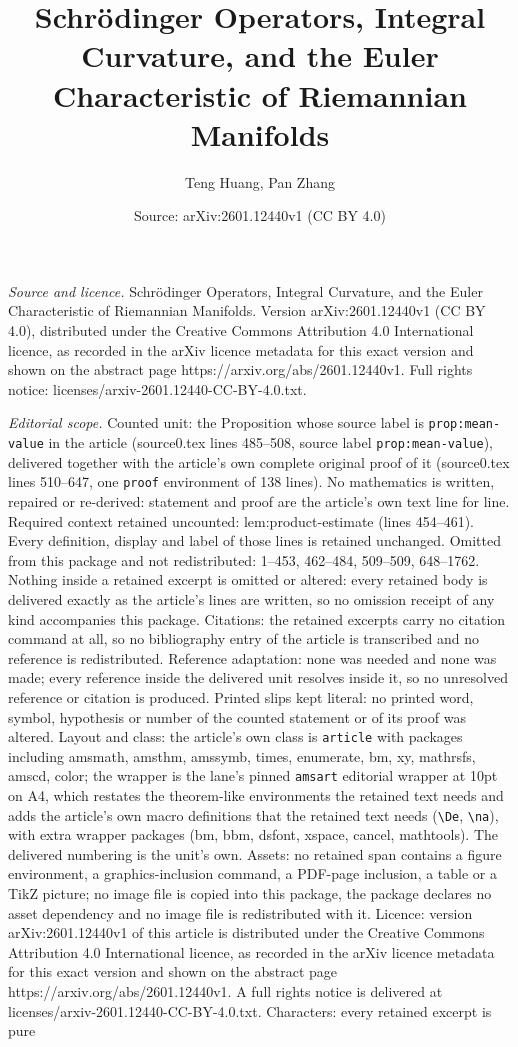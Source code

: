 \documentclass[10pt,a4paper]{amsart}
\title[Schr\"odinger Operators, Integral Curvature, and the Euler C]{Schr\"odinger Operators, Integral Curvature, and the Euler Characteristic of Riemannian Manifolds}
\author{Teng Huang, Pan Zhang}
\date{Source: arXiv:2601.12440v1 (CC BY 4.0)}
\begin{document}
\maketitle

\noindent\emph{Source and licence.} Schr\"odinger Operators, Integral Curvature, and the Euler Characteristic of Riemannian Manifolds. Version arXiv:2601.12440v1 (CC BY 4.0), distributed under the Creative Commons Attribution 4.0 International licence, as recorded in the arXiv licence metadata for this exact version and shown on the abstract page https://arxiv.org/abs/2601.12440v1. Full rights notice: licenses/arxiv-2601.12440-CC-BY-4.0.txt.\par\smallskip

\noindent\textit{Editorial scope.} Counted unit: the Proposition whose source label is \texttt{prop:mean-value} in the article (source0.tex lines 485--508, source label \texttt{prop:mean-value}), delivered together with the article's own complete original proof of it (source0.tex lines 510--647, one \texttt{proof} environment of 138 lines). No mathematics is written, repaired or re-derived: statement and proof are the article's own text line for line. Required context retained uncounted: lem:product-estimate (lines 454--461). Every definition, display and label of those lines is retained unchanged. Omitted from this package and not redistributed: 1--453, 462--484, 509--509, 648--1762. Nothing inside a retained excerpt is omitted or altered: every retained body is delivered exactly as the article's lines are written, so no omission receipt of any kind accompanies this package. Citations: the retained excerpts carry no citation command at all, so no bibliography entry of the article is transcribed and no reference is redistributed. Reference adaptation: none was needed and none was made; every reference inside the delivered unit resolves inside it, so no unresolved reference or citation is produced. Printed slips kept literal: no printed word, symbol, hypothesis or number of the counted statement or of its proof was altered. Layout and class: the article's own class is \texttt{article} with packages including amsmath, amsthm, amssymb, times, enumerate, bm, xy, mathrsfs, amscd, color; the wrapper is the lane's pinned \texttt{amsart} editorial wrapper at 10pt on A4, which restates the theorem-like environments the retained text needs and adds the article's own macro definitions that the retained text needs (\texttt{\textbackslash De}, \texttt{\textbackslash na}), with extra wrapper packages (bm, bbm, dsfont, xspace, cancel, mathtools). The delivered numbering is the unit's own. Assets: no retained span contains a figure environment, a graphics-inclusion command, a PDF-page inclusion, a table or a TikZ picture; no image file is copied into this package, the package declares no asset dependency and no image file is redistributed with it. Licence: version arXiv:2601.12440v1 of this article is distributed under the Creative Commons Attribution 4.0 International licence, as recorded in the arXiv licence metadata for this exact version and shown on the abstract page https://arxiv.org/abs/2601.12440v1. A full rights notice is delivered at licenses/arxiv-2601.12440-CC-BY-4.0.txt. Characters: every retained excerpt is pure 
\end{document}
